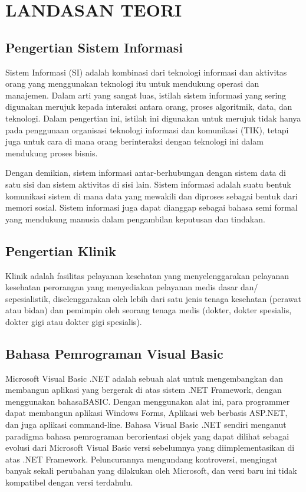 \documentclass{jtetiproposalskripsi}
\begin{document}
\chapter{LANDASAN TEORI}                

\section{Pengertian Sistem Informasi}
Sistem Informasi (SI) adalah kombinasi dari teknologi informasi dan aktivitas orang yang menggunakan teknologi itu untuk mendukung operasi dan manajemen. Dalam arti yang sangat luas, istilah sistem informasi yang sering digunakan merujuk kepada interaksi antara orang, proses algoritmik, data, dan teknologi. Dalam pengertian ini, istilah ini digunakan untuk merujuk tidak hanya pada penggunaan organisasi teknologi informasi dan komunikasi (TIK), tetapi juga untuk cara di mana orang berinteraksi dengan teknologi ini dalam mendukung proses bisnis.

Dengan demikian, sistem informasi antar-berhubungan dengan sistem data di satu sisi dan sistem aktivitas di sisi lain. Sistem informasi adalah suatu bentuk komunikasi sistem di mana data yang mewakili dan diproses sebagai bentuk dari memori sosial. Sistem informasi juga dapat dianggap sebagai bahasa semi formal yang mendukung manusia dalam pengambilan keputusan dan tindakan.

\section{Pengertian Klinik}
Klinik adalah fasilitas pelayanan kesehatan yang menyelenggarakan pelayanan kesehatan perorangan yang menyediakan pelayanan medis dasar dan/ sepesialistik, diselenggarakan oleh lebih dari satu jenis tenaga kesehatan (perawat atau bidan) dan pemimpin oleh seorang tenaga medis (dokter, dokter spesialis, dokter gigi atau dokter gigi spesialis).

\section{Bahasa Pemrograman Visual Basic}
Microsoft Visual Basic .NET adalah sebuah alat untuk mengembangkan dan membangun aplikasi yang bergerak di atas sistem .NET Framework, dengan menggunakan bahasaBASIC. Dengan menggunakan alat ini, para programmer dapat membangun aplikasi Windows Forms, Aplikasi web berbasis ASP.NET, dan juga aplikasi command-line.  Bahasa Visual Basic .NET sendiri menganut paradigma bahasa pemrograman berorientasi objek yang dapat dilihat sebagai evolusi dari Microsoft Visual Basic versi sebelumnya yang diimplementasikan di atas .NET Framework. Peluncurannya mengundang kontroversi, mengingat banyak sekali perubahan yang dilakukan oleh Microsoft, dan versi baru ini tidak kompatibel dengan versi terdahulu.
\end{document}
